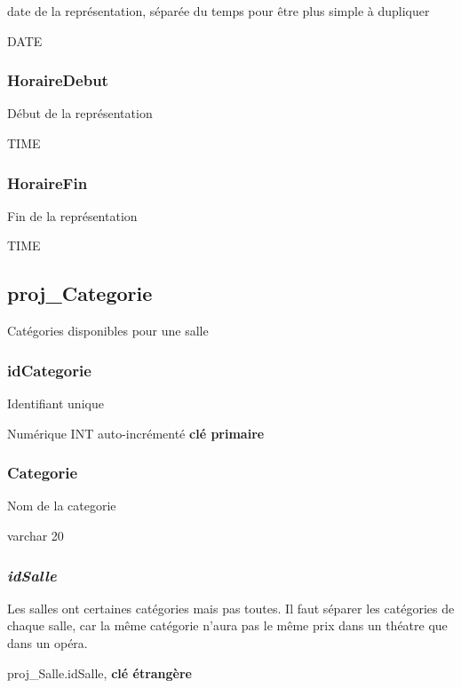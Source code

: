 date de la représentation, séparée du temps pour être plus simple à
dupliquer

DATE

\subsubsection{HoraireDebut}\label{horairedebut}

Début de la représentation

TIME

\subsubsection{HoraireFin}\label{horairefin}

Fin de la représentation

TIME

\subsection{proj\_Categorie}\label{projux5fcategorie}

Catégories disponibles pour une salle

\subsubsection{\texorpdfstring{\textbf{idCategorie}}{idCategorie}}\label{idcategorie}

Identifiant unique

Numérique INT auto-incrémenté \textbf{clé primaire}

\subsubsection{Categorie}\label{categorie}

Nom de la categorie

varchar 20

\subsubsection{\texorpdfstring{\emph{idSalle}}{idSalle}}\label{idsalle-2}

Les salles ont certaines catégories mais pas toutes. Il faut séparer les
catégories de chaque salle, car la même catégorie n'aura pas le même
prix dans un théatre que dans un opéra.

proj\_Salle.idSalle, \textbf{clé étrangère}

